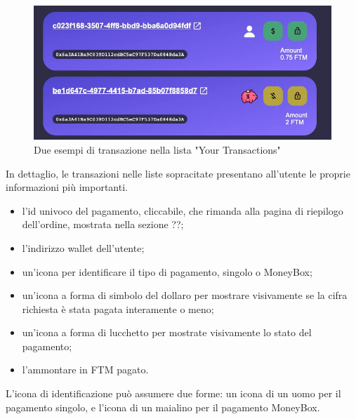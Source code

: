                 \begin{figure}[H]
                    \centering
                    \includegraphics[scale=0.4]{immagini/Transaction/transactionsmall.jpg}
                    \caption{Due esempi di transazione nella lista "Your Transactions"}
                \end{figure}

                In dettaglio, le transazioni nelle liste sopracitate presentano all'utente le proprie informazioni più importanti.

                \begin{itemize}
                    \item l'id univoco del pagamento, cliccabile, che rimanda alla pagina di riepilogo dell'ordine, mostrata nella sezione ??;
                    \item l'indirizzo wallet dell'utente;
                    \item un'icona per identificare il tipo di pagamento, singolo o MoneyBox;
                    \item un'icona a forma di simbolo del dollaro per mostrare visivamente se la cifra richiesta è stata pagata interamente o meno;
                    \item un'icona a forma di lucchetto per mostrate visivamente lo stato del pagamento;
                    \item l'ammontare in FTM pagato.
                \end{itemize}

                L'icona di identificazione può assumere due forme: un icona di un uomo per il pagamento singolo, e l'icona di un maialino per il pagamento MoneyBox.

